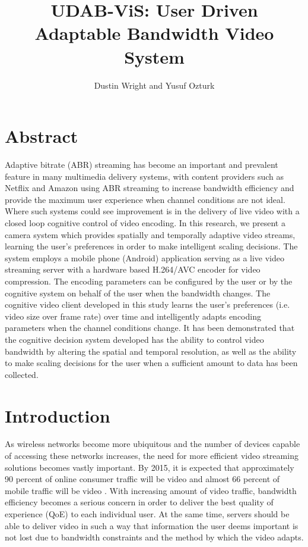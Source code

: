 \documentclass[a4paper,12pt]{article}
\begin{document}
\title{UDAB-ViS: User Driven Adaptable Bandwidth Video System}
\author{Dustin Wright and Yusuf Ozturk}
\maketitle


\section*{Abstract}
Adaptive bitrate (ABR) streaming has become an important and prevalent feature in many multimedia delivery systems, with content providers such as Netflix and Amazon using ABR streaming to increase bandwidth efficiency and provide the maximum user experience when channel conditions are not ideal. Where such systems could see improvement is in the delivery of live video with a closed loop cognitive control of video encoding. In this research, we present a camera system which provides spatially and temporally adaptive video streams, learning the user’s preferences in order to make intelligent scaling decisions. The system employs a mobile phone (Android) application serving as a live video streaming server with a hardware based H.264/AVC encoder for video compression. The encoding parameters can be configured by the user or by the cognitive system on behalf of the user when the bandwidth changes. The cognitive video client  developed in this study learns the user’s preferences (i.e. video size over frame rate) over time and intelligently adapts  encoding parameters when the channel conditions change. It has been demonstrated that the cognitive decision system developed has  the ability to control video bandwidth by altering the spatial and temporal resolution, as well as the ability to make scaling decisions for the user when a sufficient amount to data has been collected.


\section{Introduction}
\label{sec:Intro}

As wireless networks become more ubiquitous and the number of devices capable of accessing these networks increases, the need for more efficient video streaming solutions becomes vastly important. By 2015, it is expected that approximately 90 percent of online consumer traffic will be video and almost 66 percent of mobile traffic will be video \cite{HASQoE}. With increasing amount of video traffic, bandwidth efficiency becomes a serious concern in order to deliver the best quality of experience (QoE) to each individual user. At the same time, servers should be able to deliver video in such a way that information the user deems important is not lost due to bandwidth constraints and the method by which the video adapts.
\end{document}
